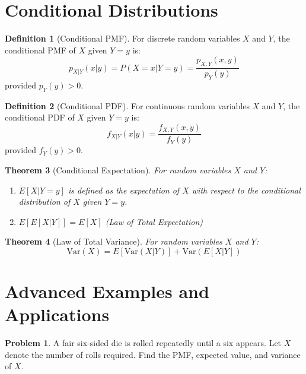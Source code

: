\documentclass[12pt,a4paper]{article}
\theoremstyle{plain}
\newtheorem{theorem}{Theorem}[section]
\theoremstyle{definition}
\newtheorem{definition}[theorem]{Definition}
\newtheorem{problem}{Problem}[section]
\begin{document}
\section{Conditional Distributions}

\begin{definition}[Conditional PMF]
For discrete random variables $X$ and $Y$, the conditional PMF of $X$ given $Y = y$ is:
\begin{equation}
p_{X|Y}(x|y) = P(X = x | Y = y) = \frac{p_{X,Y}(x,y)}{p_Y(y)}
\end{equation}
provided $p_Y(y) > 0$.
\end{definition}

\begin{definition}[Conditional PDF]
For continuous random variables $X$ and $Y$, the conditional PDF of $X$ given $Y = y$ is:
\begin{equation}
f_{X|Y}(x|y) = \frac{f_{X,Y}(x,y)}{f_Y(y)}
\end{equation}
provided $f_Y(y) > 0$.
\end{definition}

\begin{theorem}[Conditional Expectation]
For random variables $X$ and $Y$:
\begin{enumerate}[label=(\roman*)]
\item $E[X|Y=y]$ is defined as the expectation of $X$ with respect to the conditional distribution of $X$ given $Y = y$.
\item $E[E[X|Y]] = E[X]$ (Law of Total Expectation)
\end{enumerate}
\end{theorem}

\begin{theorem}[Law of Total Variance]
For random variables $X$ and $Y$:
\begin{equation}
\text{Var}(X) = E[\text{Var}(X|Y)] + \text{Var}(E[X|Y])
\end{equation}
\end{theorem}

\section{Advanced Examples and Applications}

\begin{problem}
A fair six-sided die is rolled repeatedly until a six appears. Let $X$ denote the number of rolls required. Find the PMF, expected value, and variance of $X$.
\end{problem}
\end{document}

